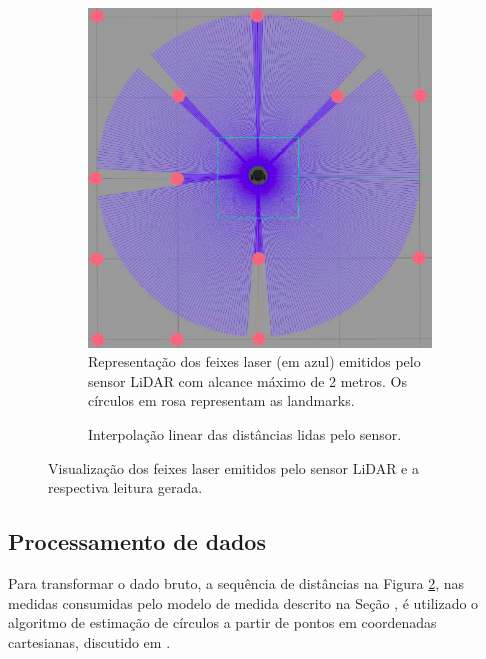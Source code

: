 \begin{figure}[h]
  \centering
  \begin{subfigure}{0.6\textwidth}
    \includegraphics[width=\textwidth, angle=90]{figs/sensor-simulation-view.png}
    \caption{Representação dos feixes laser (em azul) emitidos pelo sensor LiDAR com 
    alcance máximo de 2 metros. Os círculos em rosa representam as landmarks.}
    \label{fig:laser-beams-visualization}
  \end{subfigure}
  \begin{subfigure}{0.8\textwidth}
    
    \caption{Interpolação linear das distâncias lidas pelo sensor.}
    \label{fig:sensor-raw-data}
  \end{subfigure}
  \caption{Visualização dos feixes laser emitidos pelo sensor LiDAR e a 
  respectiva leitura gerada.}
  \label{fig:sensor-visualization-and-reading}
\end{figure}

\subsection{Processamento de dados}
Para transformar o dado bruto, a sequência de distâncias na Figura 
\ref{fig:sensor-raw-data}, nas medidas consumidas pelo modelo de medida 
descrito na Seção \emph{}, é utilizado o 
algoritmo de estimação de círculos a partir de pontos em coordenadas 
cartesianas, discutido em  \cite[p.~903]{al2009error}.

